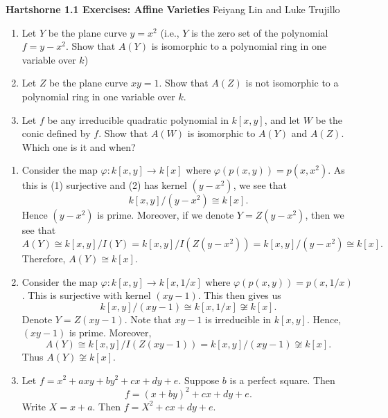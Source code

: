 \documentclass{hw_pset} %
\renewcommand{\phi}{\varphi}
\newcommand{\header}[2]{
    {\noindent
    {\Large \bf Hartshorne #1 Exercises: #2}
    \hfill 
    {\large Feiyang Lin and Luke Trujillo}
    \vspace{0.5cm}}
}
\begin{document}
\header{1.1}{Affine Varieties}
    
\begin{exercise}[1.1]
    \begin{enumerate}
        \item Let $Y$ be the plane curve $y = x^2$ (i.e., $Y$ is the zero set of 
        the polynomial $f = y - x^2$. Show that $A(Y)$ is isomorphic to a polynomial ring 
        in one variable over $k$)

        \item Let $Z$ be the plane curve $xy = 1$. Show that $A(Z)$ is not isomorphic to 
        a polynomial ring in one variable over $k$. 
        
        \item Let $f$ be any irreducible quadratic polynomial in $k[x, y]$, and let 
        $W$ be the conic defined by $f$. Show that $A(W)$ is isomorphic to $A(Y)$ and $A(Z)$.
        Which one is it and when? 
    \end{enumerate}
\end{exercise}

\begin{solution}
    \begin{enumerate}
        \item Consider the map $\phi: k[x, y] \to k[x]$ where $\phi(p(x, y)) = p(x, x^2)$. 
        As this is (1) surjective and (2) has kernel $(y - x^2)$, we see that 
        \[
            k[x, y]/(y - x^2) \cong k[x].
        \]
        Hence $(y - x^2)$ is prime. Moreover, if we denote 
        $Y = Z(y - x^2)$, then we see that
        \[
            A(Y) \cong k[x, y]/I(Y) = k[x, y]/I(Z(y - x^2)) = k[x, y]/(y - x^2)
            \cong k[x].
        \]
        Therefore, $A(Y) \cong k[x]$. 

        \item Consider the map 
        $\phi: k[x, y] \to k[x, 1/x]$ where $\phi(p(x, y)) = p(x, 1/x)$. This 
        is surjective with kernel $(xy - 1)$. This then gives us 
        \[
            k[x, y]/(xy - 1) \cong k[x, 1/x] \not\cong k[x].
        \]
        Denote $Y = Z(xy - 1)$. Note that $xy - 1$ is irreducible in $k[x, y]$. 
        Hence, $(xy - 1)$ is prime. Moreover, 
        \[
            A(Y) \cong k[x, y]/I(Z(xy - 1)) = k[x, y]/(xy - 1)\not\cong k[x].
        \]
        Thus $A(Y) \not\cong k[x]$. 

        \item Let $f = x^2 + axy + by^2 + cx + dy + e$. 
        Suppose $b$ is a perfect square. Then 
        \[
            f = (x + by)^2 + cx + dy + e.
        \]
        Write $X = x + a$. Then $f = X^2 + cx + dy +e$. 
    \end{enumerate}
\end{solution}
\end{document}
